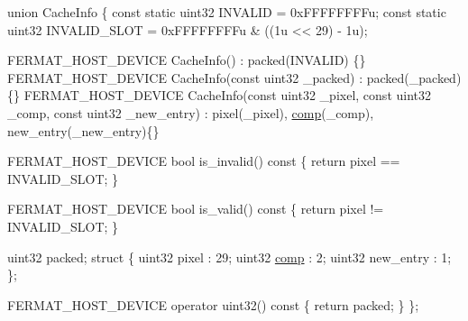 \begin{DoxyCodeInclude}
    \textcolor{keyword}{union }CacheInfo
    \{
        \textcolor{keyword}{const} \textcolor{keyword}{static} uint32 INVALID = 0xFFFFFFFFu;
        \textcolor{keyword}{const} \textcolor{keyword}{static} uint32 INVALID\_SLOT = 0xFFFFFFFFu & ((1u << 29) - 1u);

        FERMAT\_HOST\_DEVICE CacheInfo() : packed(INVALID) \{\}
        FERMAT\_HOST\_DEVICE CacheInfo(\textcolor{keyword}{const} uint32 \_packed) : packed(\_packed) \{\}
        FERMAT\_HOST\_DEVICE CacheInfo(\textcolor{keyword}{const} uint32 \_pixel, \textcolor{keyword}{const} uint32 \_comp, \textcolor{keyword}{const} uint32 \_new\_entry) : 
      pixel(\_pixel), \hyperlink{group___basic_gae73662ac7ace330f8b3f726381785f28}{comp}(\_comp), new\_entry(\_new\_entry)\{\}

        FERMAT\_HOST\_DEVICE
        \textcolor{keywordtype}{bool} is\_invalid()\textcolor{keyword}{ const }\{ \textcolor{keywordflow}{return} pixel == INVALID\_SLOT; \}

        FERMAT\_HOST\_DEVICE
        \textcolor{keywordtype}{bool} is\_valid()\textcolor{keyword}{ const }\{ \textcolor{keywordflow}{return} pixel != INVALID\_SLOT; \}

        uint32  packed;
        \textcolor{keyword}{struct}
        \{
            uint32 pixel        : 29;
            uint32 \hyperlink{group___basic_gae73662ac7ace330f8b3f726381785f28}{comp}         : 2;
            uint32 new\_entry    : 1;
        \};

        FERMAT\_HOST\_DEVICE \textcolor{keyword}{operator} uint32()\textcolor{keyword}{ const }\{ \textcolor{keywordflow}{return} packed; \}
    \};
\end{DoxyCodeInclude}
